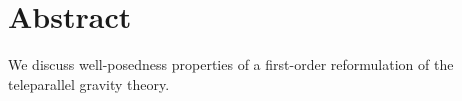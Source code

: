 \documentclass[
10pt, %
a4paper, %
oneside, %
headinclude,footinclude, %
BCOR5mm, %
]{scrartcl}
\title{\large\normalfont\spacedallcaps{Computational aspects of teleparallel gravity}} %
\author{\normalsize\textsc{Ilya Peshkov}$^1$ \& 
\normalsize\textsc{Evgeniy Romenski}$^{2,3}$ \&
\normalsize\textsc{Michael Dumbser}$^{4}$
} %
\date{\small\today} %
\begin{document}

\renewcommand{\sectionmark}[1]{\markright{\spacedlowsmallcaps{#1}}} %
\lehead{\mbox{\llap{\small\thepage\kern1em\color{halfgray} 
\vline}\color{halfgray}\hspace{0.5em}\rightmark\hfil}} %

\pagestyle{scrheadings} %


\maketitle %

\setcounter{tocdepth}{2} %

\tableofcontents %




\section*{Abstract} %
We discuss well-posedness properties of a first-order reformulation of the teleparallel gravity
theory.
\end{document}
